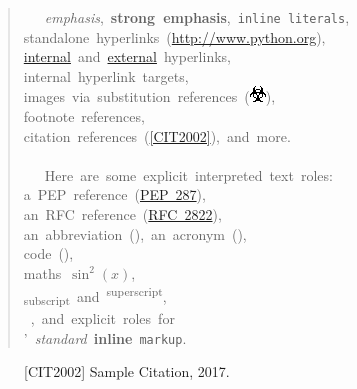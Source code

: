 \documentclass[a4paper]{article}
\begin{document}
\begin{quote}
\ttfamily\raggedright
~~~\emph{emphasis},~\textbf{strong~emphasis},~\texttt{inline~literals},\\
standalone~hyperlinks~(\url{http://www.python.org}),\\
\hyperref[internal]{internal}~and~\href{http://www.python.org/}{external}~hyperlinks,\\
%
\label{internal}internal~hyperlink~targets,\\
images~via~substitution~references~(\includegraphics{../../../docs/user/rst/images/biohazard.png}),\\
footnote~references,\\
citation~references~(\hyperlink{cit2002}{[CIT2002]}),~and~more.\\
~\\
~~~Here~are~some~explicit~interpreted~text~roles:\\
a~PEP~reference~(\href{https://www.python.org/dev/peps/pep-0287}{PEP~287}),\\
an~RFC~reference~(\href{https://tools.ietf.org/html/rfc2822.html}{RFC~2822}),\\
an~abbreviation~(),~an~acronym~(),\\
code~(\texttt{}),\\
maths~$\sin^2(x)$,\\
\textsubscript{subscript}~and~\textsuperscript{superscript},\\
~,~and~explicit~roles~for\\
'~\emph{standard}~\textbf{inline}~\texttt{markup}.
\end{quote}
%
\begin{figure}[b][CIT2002]
Sample Citation, 2017.
\end{figure}
\end{document}
